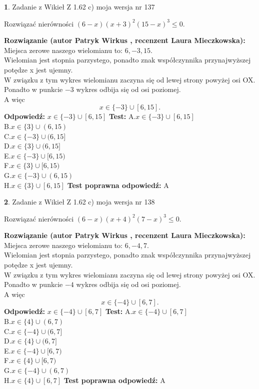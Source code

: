 \documentclass[12pt, a4paper]{article}
\theoremstyle{definition} %
\newtheorem{zad}{}
\newcommand{\zadStart}[1]{\begin{zad}#1\newline}
\newcommand{\zadStop}{\end{zad}}
\newcommand{\rozwStart}[2]{\noindent \textbf{Rozwiązanie (autor #1 , recenzent #2): }\newline}
\newcommand{\rozwStop}{\newline}
\newcommand{\odpStart}{\noindent \textbf{Odpowiedź:}\newline}
\newcommand{\odpStop}{\newline}
\newcommand{\testStart}{\noindent \textbf{Test:}\newline}
\newcommand{\testStop}{\newline}
\newcommand{\kluczStart}{\noindent \textbf{Test poprawna odpowiedź:}\newline}
\newcommand{\kluczStop}{\newline}
\begin{document}
\zadStart{Zadanie z Wikieł Z 1.62 c) moja wersja nr 137}

Rozwiązać nierówności $(6-x)(x+3)^{2}(15-x)^{3}\le0$.
\zadStop
\rozwStart{Patryk Wirkus}{Laura Mieczkowska}
Miejsca zerowe naszego wielomianu to: $6, -3, 15$.\\
Wielomian jest stopnia parzystego, ponadto znak współczynnika przy\linebreak najwyższej potędze x jest ujemny.\\ W związku z tym wykres wielomianu zaczyna się od lewej strony powyżej osi OX.\\
Ponadto w punkcie $-3$ wykres odbija się od osi poziomej.\\
A więc $$x \in \{-3\} \cup [6,15].$$
\rozwStop
\odpStart
$x \in \{-3\} \cup [6,15]$
\odpStop
\testStart
A.$x \in \{-3\} \cup [6,15]$\\
B.$x \in \{3\} \cup (6,15)$\\
C.$x \in \{-3\} \cup (6,15]$\\
D.$x \in \{3\} \cup (6,15]$\\
E.$x \in \{-3\} \cup [6,15)$\\
F.$x \in \{3\} \cup [6,15)$\\
G.$x \in \{-3\} \cup (6,15)$\\
H.$x \in \{3\} \cup [6,15]$
\testStop
\kluczStart
A
\kluczStop



\zadStart{Zadanie z Wikieł Z 1.62 c) moja wersja nr 138}

Rozwiązać nierówności $(6-x)(x+4)^{2}(7-x)^{3}\le0$.
\zadStop
\rozwStart{Patryk Wirkus}{Laura Mieczkowska}
Miejsca zerowe naszego wielomianu to: $6, -4, 7$.\\
Wielomian jest stopnia parzystego, ponadto znak współczynnika przy\linebreak najwyższej potędze x jest ujemny.\\ W związku z tym wykres wielomianu zaczyna się od lewej strony powyżej osi OX.\\
Ponadto w punkcie $-4$ wykres odbija się od osi poziomej.\\
A więc $$x \in \{-4\} \cup [6,7].$$
\rozwStop
\odpStart
$x \in \{-4\} \cup [6,7]$
\odpStop
\testStart
A.$x \in \{-4\} \cup [6,7]$\\
B.$x \in \{4\} \cup (6,7)$\\
C.$x \in \{-4\} \cup (6,7]$\\
D.$x \in \{4\} \cup (6,7]$\\
E.$x \in \{-4\} \cup [6,7)$\\
F.$x \in \{4\} \cup [6,7)$\\
G.$x \in \{-4\} \cup (6,7)$\\
H.$x \in \{4\} \cup [6,7]$
\testStop
\kluczStart
A
\kluczStop
\end{document}
